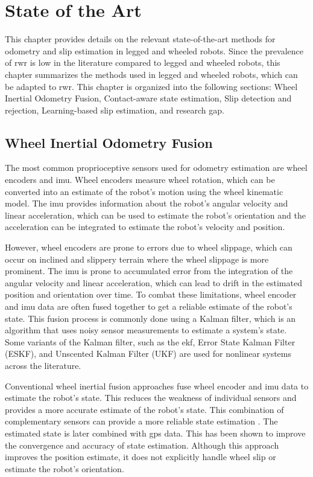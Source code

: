 \documentclass[report.tex]{subfiles}
\begin{document}
    
\chapter{State of the Art}
\label{chap:sota}

This chapter provides details on the relevant state-of-the-art methods for odometry and slip estimation in legged and wheeled robots. Since the prevalence of \gls{rwr} is low in the literature compared to legged and wheeled robots, this chapter summarizes the methods used in legged and wheeled robots, which can be adapted to \gls{rwr}. This chapter is organized into the following sections: Wheel Inertial Odometry Fusion, Contact-aware state estimation, Slip detection and rejection, Learning-based slip estimation, and research gap. 

\section{Wheel Inertial Odometry Fusion}
\label{sec:sota_wheel_inertial}

    The most common proprioceptive sensors used for odometry estimation are wheel encoders and \gls{imu}. Wheel encoders measure wheel rotation, which can be converted into an estimate of the robot’s motion using the wheel kinematic model. The \gls{imu} provides information about the robot's angular velocity and linear acceleration, which can be used to estimate the robot's orientation and the acceleration can be integrated to estimate the robot's velocity and position. 
    
    However, wheel encoders are prone to errors due to wheel slippage, which can occur on inclined and slippery terrain where the wheel slippage is more prominent. The \gls{imu} is prone to accumulated error from the integration of the angular velocity and linear acceleration, which can lead to drift in the estimated position and orientation over time. To combat these limitations, wheel encoder and \gls{imu} data are often fused together to get a reliable estimate of the robot's state. This fusion process is commonly done using a Kalman filter, which is an algorithm that uses noisy sensor measurements to estimate a system's state. Some variants of the Kalman filter, such as the \gls{ekf}, Error State Kalman Filter (ESKF), and Unscented Kalman Filter (UKF) are used for nonlinear systems across the literature. 
    
    Conventional wheel inertial fusion approaches fuse wheel encoder and \gls{imu} data to estimate the robot's state. This reduces the weakness of individual sensors and provides a more accurate estimate of the robot's state. This combination of complementary sensors can provide a more reliable state estimation \cite{Yousuf2016}. The estimated state is later combined with \gls{gps} data. This has been shown to improve the convergence and accuracy of state estimation. Although this approach improves the position estimate, it does not explicitly handle wheel slip or estimate the robot's orientation.
    
\end{document}
